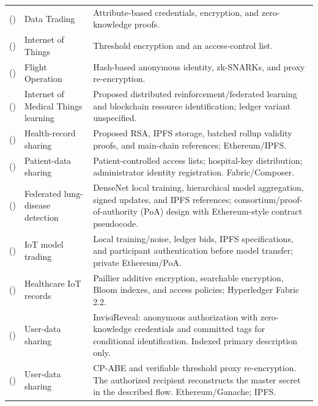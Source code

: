 \begin{longtable}{@{}>{\raggedright\arraybackslash}m{}>{\raggedright\arraybackslash}m{}>{\raggedright\arraybackslash}m{}@{}}
\cite{10.1109/tc.2023.3251846} (\citeyear{10.1109/tc.2023.3251846}) & Data Trading & Attribute-based credentials, encryption, and zero-knowledge proofs. \\
\addlinespace[5pt]
\cite{10.1109/jiot.2023.3307073} (\citeyear{10.1109/jiot.2023.3307073}) & Internet of Things & Threshold encryption and an access-control list. \\
\addlinespace[5pt]
\cite{10.1109/jiot.2023.3296460} (\citeyear{10.1109/jiot.2023.3296460}) & Flight Operation & Hash-based anonymous identity, zk-SNARKs, and proxy re-encryption. \\
\addlinespace[5pt]
\cite{updateDhasaratha2024IoMT} (\citeyear{updateDhasaratha2024IoMT}) & Internet of Medical Things learning & Proposed distributed reinforcement/federated learning and blockchain resource identification; ledger variant unspecified. \\
\addlinespace[5pt]
\cite{updateMaZhang2024Rollup} (\citeyear{updateMaZhang2024Rollup}) & Health-record sharing & Proposed RSA, IPFS storage, batched rollup validity proofs, and main-chain references; Ethereum/IPFS. \\
\addlinespace[5pt]
\cite{updateMasood2024Patient} (\citeyear{updateMasood2024Patient}) & Patient-data sharing & Patient-controlled access lists; hospital-key distribution; administrator identity registration. Fabric/Composer. \\
\addlinespace[5pt]
\cite{updateGupta2024LungFL} (\citeyear{updateGupta2024LungFL}) & Federated lung-disease detection & DenseNet local training, hierarchical model aggregation, signed updates, and IPFS references; consortium/proof-of-authority (PoA) design with Ethereum-style contract pseudocode. \\
\addlinespace[5pt]
\cite{updateHussain2025ZeroTrust} (\citeyear{updateHussain2025ZeroTrust}) & IoT model trading & Local training/noise, ledger bids, IPFS specifications, and participant authentication before model transfer; private Ethereum/PoA. \\
\addlinespace[5pt]
\cite{updateGuan2025Healthcare} (\citeyear{updateGuan2025Healthcare}) & Healthcare IoT records & Paillier additive encryption, searchable encryption, Bloom indexes, and access policies; Hyperledger Fabric 2.2. \\
\addlinespace[5pt]
\cite{updateHu2024InvisiReveal} (\citeyear{updateHu2024InvisiReveal}) & User-data sharing & InvisiReveal: anonymous authorization with zero-knowledge credentials and committed tags for conditional identification. Indexed primary description only. \\
\addlinespace[5pt]
\cite{updateRen2024DistributedKMS} (\citeyear{updateRen2024DistributedKMS}) & User-data sharing & CP-ABE and verifiable threshold proxy re-encryption. The authorized recipient reconstructs the master secret in the described flow. Ethereum/Ganache; IPFS. \\
\end{longtable}
\endgroup

